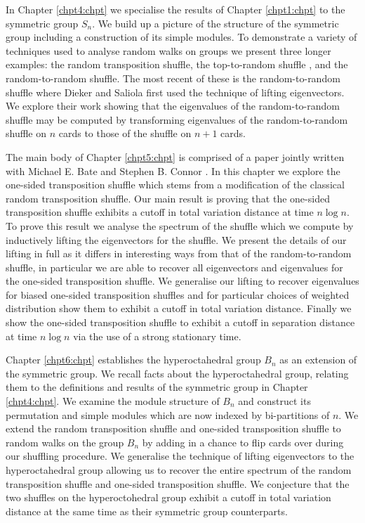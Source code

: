 \documentclass[11pt]{report}
\begin{document}
In Chapter \ref{chpt4:chpt} we specialise the results of Chapter \ref{chpt1:chpt} to the symmetric group $S_{n}$. We build up a picture of the structure of the symmetric group including a construction of its simple modules. To demonstrate a variety of techniques used to analyse random walks on groups we present three longer examples: the random transposition shuffle\cite{diaconis1981generating}, the top-to-random shuffle \cite{aldous1986shuffling}, and the random-to-random shuffle\cite{dieker2018spectral}.  	
The most recent of these is the random-to-random shuffle where Dieker and Saliola first used the technique of lifting eigenvectors. We explore their work showing that the eigenvalues of the random-to-random shuffle may be computed by transforming eigenvalues of the random-to-random shuffle on $n$ cards to those of the shuffle on $n+1$ cards. 


The main body of Chapter \ref{chpt5:chpt} is comprised of a paper jointly written with Michael E. Bate and Stephen B. Connor \cite{bate2019cutoff}. In this chapter we explore the one-sided transposition shuffle which stems from a modification of the classical random transposition shuffle. Our main result is proving that the one-sided transposition shuffle exhibits a cutoff in total variation distance at time $ n \log n$. To prove this result we analyse the spectrum of the shuffle which we compute by inductively lifting the eigenvectors for the shuffle. We present the details of our lifting in full as it differs in interesting ways from that of the random-to-random shuffle, in particular we are able to recover all eigenvectors and eigenvalues for the one-sided transposition shuffle. We generalise our lifting to recover eigenvalues for biased one-sided transposition shuffles and for particular choices of weighted distribution show them to exhibit a cutoff in total variation distance. Finally we show the one-sided transposition shuffle to exhibit a cutoff in separation distance at time $n\log n$ via the use of a strong stationary time.


Chapter \ref{chpt6:chpt} establishes the hyperoctahedral group $B_{n}$ as an extension of the symmetric group. We recall facts about the hyperoctahedral group, relating them to the definitions and results of the symmetric group in Chapter \ref{chpt4:chpt}. We examine the module structure of $B_{n}$ and construct its permutation and simple modules which are now indexed by bi-partitions of $n$. We extend the random transposition shuffle and one-sided transposition shuffle to random walks on the group $B_{n}$ by adding in a chance to flip cards over during our shuffling procedure. We generalise the technique of lifting eigenvectors to the hyperoctahedral group allowing us to recover the entire spectrum of the random transposition shuffle and one-sided transposition shuffle. We conjecture that the two shuffles on the hyperoctohedral group exhibit a cutoff in total variation distance at the same time as their symmetric group counterparts.
\end{document}
